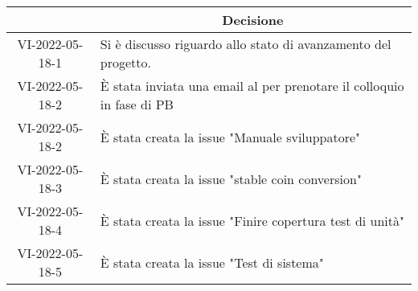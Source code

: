 \begin{table}[H]
	\centering
	\renewcommand{\arraystretch}{1.8}
	\begin{tabular}{c | p{10cm}}
		\rowcolor[HTML]{125E28}
		\multicolumn{1}{c}{\color[HTML]{FFFFFF} \textbf{ID}} &
		\multicolumn{1}{c}{\color[HTML]{FFFFFF} \textbf{Decisione}} \\
		\hline
		VI-2022-05-18-1 & Si è discusso riguardo allo stato di avanzamento del progetto. \\ \hline
		VI-2022-05-18-2 & È stata inviata una email al \commitNameS{} per prenotare il colloquio in fase di PB \\ \hline
		VI-2022-05-18-2 & È stata creata la issue "Manuale sviluppatore" \\ \hline
		VI-2022-05-18-3 & È stata creata la issue "stable coin conversion" \\ \hline
		VI-2022-05-18-4 & È stata creata la issue "Finire copertura test di unità" \\ \hline
		VI-2022-05-18-5 & È stata creata la issue "Test di sistema" \\ \hline
	\end{tabular}
\end{table}